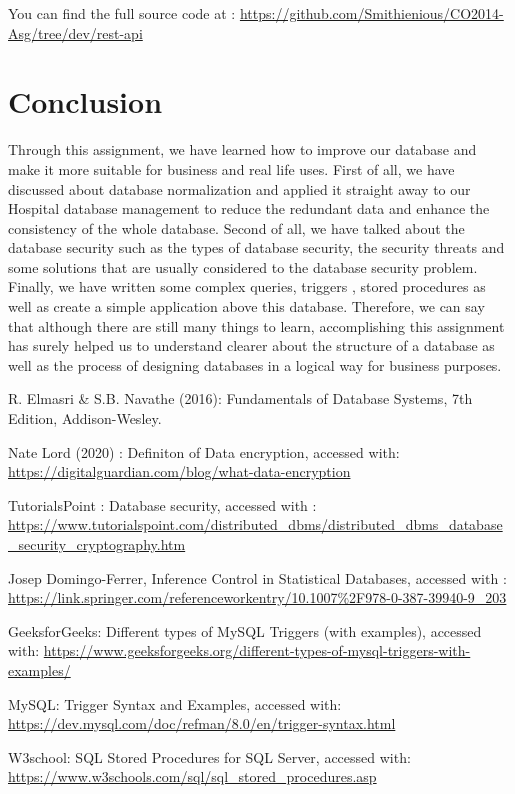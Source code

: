 \documentclass[a4paper]{article}
\numberwithin{equation}{section}
\begin{document}
You can find the full source code at :  \url{https://github.com/Smithienious/CO2014-Asg/tree/dev/rest-api}

\section{Conclusion}
Through this assignment, we have learned how to improve our database and make it more suitable for business and real life uses. First of all, we have discussed about database normalization  and applied it straight away to our Hospital database management to reduce the redundant data and enhance the consistency of the whole database. Second of all, we have talked about the database security such as the types of database security, the security threats and some solutions that are usually considered to the database security problem. Finally, we have written some complex queries, triggers , stored procedures as well as create a simple application above this database. Therefore, we can say that although there are still many things to learn, accomplishing this assignment has surely helped us to understand clearer about the structure of a database as well as the process of designing databases in a logical way for business purposes.

\pagebreak
\begin{thebibliography}{9}
  R. Elmasri \& S.B. Navathe (2016): Fundamentals of Database Systems, 7th
  Edition, Addison-Wesley.

  Nate Lord (2020) : Definiton of Data encryption, accessed with: \url{https://digitalguardian.com/blog/what-data-encryption}

  TutorialsPoint : Database security, accessed with : \url{https://www.tutorialspoint.com/distributed_dbms/distributed_dbms_database_security_cryptography.htm}

  Josep Domingo-Ferrer, Inference Control in Statistical Databases, accessed with : \url{https://link.springer.com/referenceworkentry/10.1007\%2F978-0-387-39940-9_203}

  GeeksforGeeks: Different types of MySQL Triggers (with examples), accessed with: \url{https://www.geeksforgeeks.org/different-types-of-mysql-triggers-with-examples/}

  MySQL: Trigger Syntax and Examples, accessed with: \url{https://dev.mysql.com/doc/refman/8.0/en/trigger-syntax.html}

  W3school: SQL Stored Procedures for SQL Server, accessed with: \url{https://www.w3schools.com/sql/sql_stored_procedures.asp}

\end{thebibliography}
\end{document}
